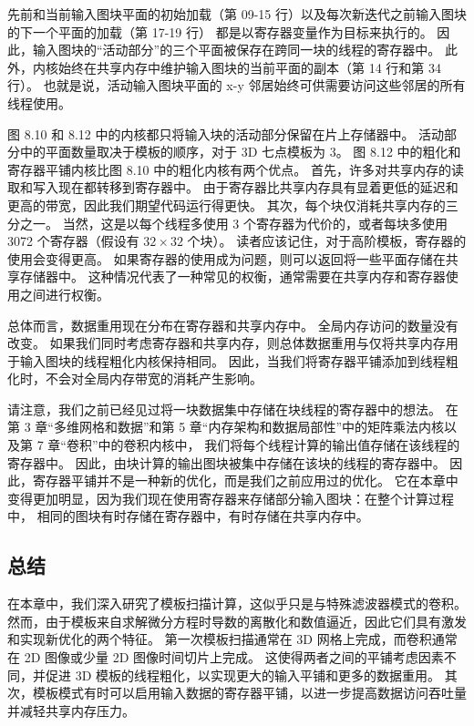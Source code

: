 先前和当前输入图块平面的初始加载（第 09-15 行）以及每次新迭代之前输入图块的下一个平面的加载（第 17-19 行）
都是以寄存器变量作为目标来执行的。 因此，输入图块的“活动部分”的三个平面被保存在跨同一块的线程的寄存器中。 
此外，内核始终在共享内存中维护输入图块的当前平面的副本（第 14 行和第 34 行）。 
也就是说，活动输入图块平面的 x-y 邻居始终可供需要访问这些邻居的所有线程使用。

图 8.10 和 8.12 中的内核都只将输入块的活动部分保留在片上存储器中。 
活动部分中的平面数量取决于模板的顺序，对于 3D 七点模板为 3。 
图 8.12 中的粗化和寄存器平铺内核比图 8.10 中的粗化内核有两个优点。 首先，许多对共享内存的读取和写入现在都转移到寄存器中。 
由于寄存器比共享内存具有显着更低的延迟和更高的带宽，因此我们期望代码运行得更快。 其次，每个块仅消耗共享内存的三分之一。 
当然，这是以每个线程多使用 3 个寄存器为代价的，或者每块多使用 3072 个寄存器（假设有 $32 \times 32$ 个块）。 
读者应该记住，对于高阶模板，寄存器的使用会变得更高。 如果寄存器的使用成为问题，则可以返回将一些平面存储在共享存储器中。 
这种情况代表了一种常见的权衡，通常需要在共享内存和寄存器使用之间进行权衡。

总体而言，数据重用现在分布在寄存器和共享内存中。 全局内存访问的数量没有改变。 
如果我们同时考虑寄存器和共享内存，则总体数据重用与仅将共享内存用于输入图块的线程粗化内核保持相同。 
因此，当我们将寄存器平铺添加到线程粗化时，不会对全局内存带宽的消耗产生影响。

请注意，我们之前已经见过将一块数据集中存储在块线程的寄存器中的想法。 
在第 3 章“多维网格和数据”和第 5 章“内存架构和数据局部性”中的矩阵乘法内核以及第 7 章“卷积”中的卷积内核中，
我们将每个线程计算的输出值存储在该线程的寄存器中。 因此，由块计算的输出图块被集中存储在该块的线程的寄存器中。 
因此，寄存器平铺并不是一种新的优化，而是我们之前应用过的优化。 
它在本章中变得更加明显，因为我们现在使用寄存器来存储部分输入图块：在整个计算过程中，
相同的图块有时存储在寄存器中，有时存储在共享内存中。

\subsection{总结}
在本章中，我们深入研究了模板扫描计算，这似乎只是与特殊滤波器模式的卷积。 
然而，由于模板来自求解微分方程时导数的离散化和数值逼近，因此它们具有激发和实现新优化的两个特征。 
第一次模板扫描通常在 3D 网格上完成，而卷积通常在 2D 图像或少量 2D 图像时间切片上完成。 
这使得两者之间的平铺考虑因素不同，并促进 3D 模板的线程粗化，以实现更大的输入平铺和更多的数据重用。 
其次，模板模式有时可以启用输入数据的寄存器平铺，以进一步提高数据访问吞吐量并减轻共享内存压力。